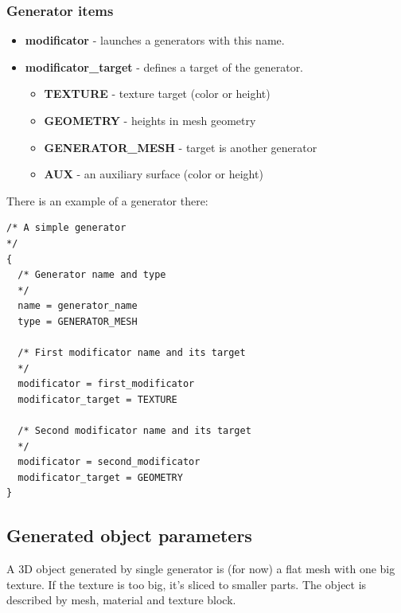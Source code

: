 \documentclass[9pt]{article}
\begin{document}
\subsubsection*{Generator items}
\begin{itemize}
\item{\bf modificator} - launches a generators with this name.
\item{\bf modificator\_target} - defines a target of the generator.
\begin{itemize}
\item{\bf TEXTURE} - texture target (color or height)
\item{\bf GEOMETRY} - heights in mesh geometry
\item{\bf GENERATOR\_MESH} - target is another generator
\item{\bf AUX} - an auxiliary surface (color or height)
\end{itemize}
\end{itemize}
There is an example of a generator there:
\begin{verbatim}
/* A simple generator
*/
{
  /* Generator name and type
  */
  name = generator_name
  type = GENERATOR_MESH
  
  /* First modificator name and its target
  */
  modificator = first_modificator
  modificator_target = TEXTURE
  
  /* Second modificator name and its target
  */
  modificator = second_modificator
  modificator_target = GEOMETRY
}
\end{verbatim}

\subsection{Generated object parameters}
A 3D object generated by single generator is (for now) a flat mesh with
one big texture. If the texture is too big, it's sliced to smaller parts.
The object is described by mesh, material and texture block.
\end{document}
